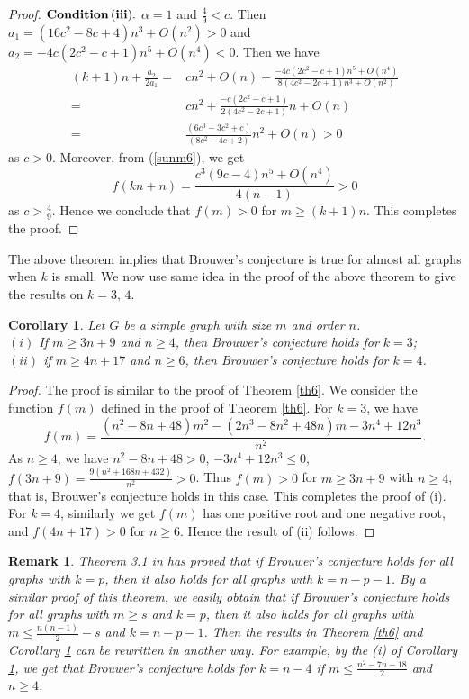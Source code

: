 \documentclass[12pt]{article}
\newtheorem{corollary}[theorem]{Corollary}
\newtheorem{remark}[theorem]{Remark}
\begin{document}
\begin{proof}
\vspace*{3mm}

\noindent
${\bf Condition\,(iii).}$ $\alpha=1$ and $\frac{4}{9}<c$. Then $a_1=(16c^2-8c+4)n^3+O(n^2)>0$ and $a_2=-4c(2c^2-c+1)n^5+O(n^4)<0$. Then we have
\begin{align*}
    (k+1)n+\frac{a_2}{2a_1}=&cn^2+O(n)+\frac{-4c(2c^2-c+1)n^5+O(n^4)} {8(4c^2-2c+1)n^3+O(n^2)}\\[3mm]
    =&cn^2+\frac{-c(2c^2-c+1)} {2(4c^2-2c+1)}n+O(n)\\[3mm]
    =&\frac{(6c^3-3c^2+c)}{(8c^2-4c+2)}n^2+O(n)>0
\end{align*}
as $c>0$. Moreover, from (\ref{sunm6}), we get
   $$f(kn+n)=\frac{c^3(9c-4)n^5+O(n^4)}{4(n-1)}>0$$ 
as $c>\frac{4}{9}$. Hence we conclude that $f(m)>0$ for $m\geq (k+1)n$. This completes the proof.
\end{proof}

 The above theorem implies that Brouwer's conjecture is true for
 almost all graphs when $k$ is small. We now use same idea in the
 proof of the above theorem to give the results on $k=3,\,4$.
\begin{corollary}\label{coro5}
  Let $G$ be a simple graph with size $m$ and order $n$.\\
  $(i)$ If $m\geq 3n+9$ and $n\geq 4$, then Brouwer's conjecture holds for
  $k=3$;\\
  $(ii)$ if $m\geq 4n+17$ and $n\geq 6$, then Brouwer's conjecture holds for
  $k=4$.
\end{corollary}

\begin{proof}
  The proof is similar to the proof of Theorem \ref{th6}. We consider the function $f(m)$ defined in the proof of Theorem \ref{th6}.
   For $k=3$, we have
  \begin{equation*}
   f(m)=\frac{(n^2-8n+48)m^2-(2n^3-8n^2+48n)m-3n^4+12n^3}{n^2}.
   \end{equation*}
 As $n\geq 4$, we have $n^2-8n+48>0$, $-3n^4+12n^3\leq 0$, $f(3n+9)=\frac{9(n^2+168n+432)}{n^2}>0$.
 Thus $f(m)>0$ for $m\geq 3n+9$ with $n\geq 4$, that is, Brouwer's conjecture holds in this
 case. This completes the proof of (i). For $k=4$, similarly we get
 $f(m)$ has one positive root and one negative root, and
 $f(4n+17)>0$ for $n\geq 6$. Hence the result of (ii) follows.
\end{proof}

\begin{remark}{\rm
  Theorem 3.1 in \cite{D} has proved that if  Brouwer's conjecture holds for all graphs with $k=p$,
  then it also holds for all graphs with $k=n-p-1$. By a similar proof of this theorem, we easily obtain that if
  Brouwer's conjecture holds for all graphs with $m\geq s$ and $k=p$, then it also holds for all graphs with $m\leq\frac{n(n-1)}{2}-s$ and $k=n-p-1$.
  Then the results in Theorem \ref{th6} and Corollary \ref{coro5}
  can be rewritten in another way. For example, by the (i) of Corollary
  \ref{coro5}, we get that Brouwer's conjecture holds for $k=n-4$ if
  $m\leq \frac{n^2-7n-18}{2}$ and $n\geq 4$.}
\end{remark}
\end{document}
